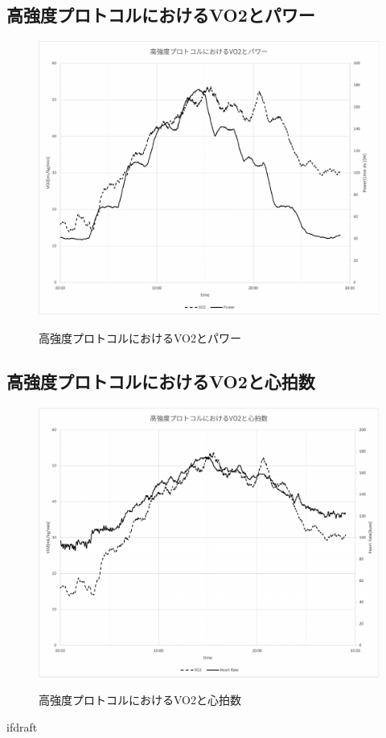 \subsection{高強度プロトコルにおけるVO2とパワー}

\begin{figure}[H]
  \begin{center}
    \label{fig:hard_vo2_power}
    \includegraphics[width=12cm]{fig/hard_vo2_power}
    \caption{高強度プロトコルにおけるVO2とパワー}
  \end{center}
\end{figure}

\subsection{高強度プロトコルにおけるVO2と心拍数}

\begin{figure}[H]
  \begin{center}
    \label{fig:hard_vo2_hr}
    \includegraphics[width=12cm]{fig/hard_vo2_hr}
    \caption{高強度プロトコルにおけるVO2と心拍数}
  \end{center}
\end{figure}

\expandafter\ifx\csname ifdraft\endcsname\relax
  
\fi
